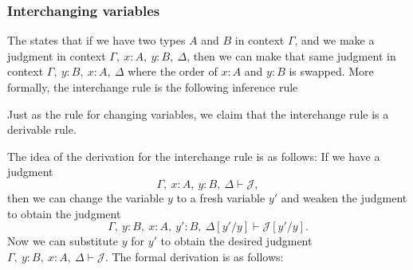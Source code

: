 \subsubsection*{Interchanging variables}

The  states that if we have two types $A$ and $B$ in context $\Gamma$, and we make a judgment in context $\Gamma,~x:A,~y:B,~\Delta$, then we can make that same judgment in context $\Gamma,~y:B,~x:A,~\Delta$ where the order of $x:A$ and $y:B$ is swapped. More formally, the interchange rule is the following inference rule
\begin{prooftree}
\end{prooftree}
Just as the rule for changing variables, we claim that the interchange rule is a derivable rule.

The idea of the derivation for the interchange rule is as follows: If we have a judgment
\begin{equation*}
  \Gamma,~x:A,~y:B,~\Delta\vdash\mathcal{J},
\end{equation*}
then we can change the variable $y$ to a fresh variable $y'$ and weaken the judgment to obtain the judgment
\begin{equation*}
  \Gamma,~y:B,~x:A,~y':B,~\Delta[y'/y]\vdash\mathcal{J}[y'/y].
\end{equation*}
Now we can substitute $y$ for $y'$ to obtain the desired judgment $\Gamma,~y:B,~x:A,~\Delta\vdash\mathcal{J}$. The formal derivation is as follows:
\begin{small}
  \begin{prooftree}
  \end{prooftree}%
\end{small}


